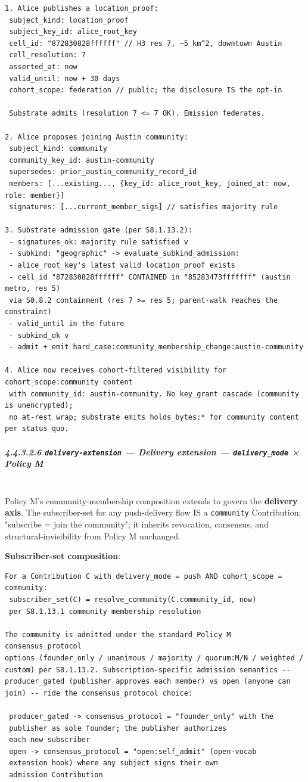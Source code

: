 \documentclass[11pt]{article}
\begin{document}
\begin{lstlisting}
1. Alice publishes a location_proof:
 subject_kind: location_proof
 subject_key_id: alice_root_key
 cell_id: "872830828ffffff" // H3 res 7, ~5 km^2, downtown Austin
 cell_resolution: 7
 asserted_at: now
 valid_until: now + 30 days
 cohort_scope: federation // public; the disclosure IS the opt-in

 Substrate admits (resolution 7 <= 7 OK). Emission federates.

2. Alice proposes joining Austin community:
 subject_kind: community
 community_key_id: austin-community
 supersedes: prior_austin_community_record_id
 members: [...existing..., {key_id: alice_root_key, joined_at: now, role: member}]
 signatures: [...current_member_sigs] // satisfies majority rule

3. Substrate admission gate (per S8.1.13.2):
 - signatures_ok: majority rule satisfied v
 - subkind: "geographic" -> evaluate_subkind_admission:
 - alice_root_key's latest valid location_proof exists
 - cell_id "872830828ffffff" CONTAINED in "85283473fffffff" (austin metro, res 5)
 via S0.8.2 containment (res 7 >= res 5; parent-walk reaches the constraint)
 - valid_until in the future
 - subkind_ok v
 - admit + emit hard_case:community_membership_change:austin-community

4. Alice now receives cohort-filtered visibility for cohort_scope:community content
 with community_id: austin-community. No key_grant cascade (community is unencrypted);
 no at-rest wrap; substrate emits holds_bytes:* for community content per status quo.
\end{lstlisting}

\subparagraph{4.4.3.2.6 \texttt{delivery-extension} — Delivery extension — \texttt{delivery\_mode} × Policy M}\mbox{}\\


Policy M's community-membership composition extends to govern the \textbf{delivery axis}. The subscriber-set for any push-delivery flow IS a \texttt{community} Contribution; "subscribe = join the community"; it inherits revocation, consensus, and structural-invisibility from Policy M unchanged.


\textbf{Subscriber-set composition}:


\begin{lstlisting}
For a Contribution C with delivery_mode = push AND cohort_scope = community:
 subscriber_set(C) = resolve_community(C.community_id, now)
 per S8.1.13.1 community membership resolution

The community is admitted under the standard Policy M consensus_protocol
options (founder_only / unanimous / majority / quorum:M/N / weighted /
custom) per S8.1.13.2. Subscription-specific admission semantics --
producer_gated (publisher approves each member) vs open (anyone can
join) -- ride the consensus_protocol choice:

 producer_gated -> consensus_protocol = "founder_only" with the
 publisher as sole founder; the publisher authorizes
 each new subscriber
 open -> consensus_protocol = "open:self_admit" (open-vocab
 extension hook) where any subject signs their own
 admission Contribution
\end{lstlisting}
\end{document}
